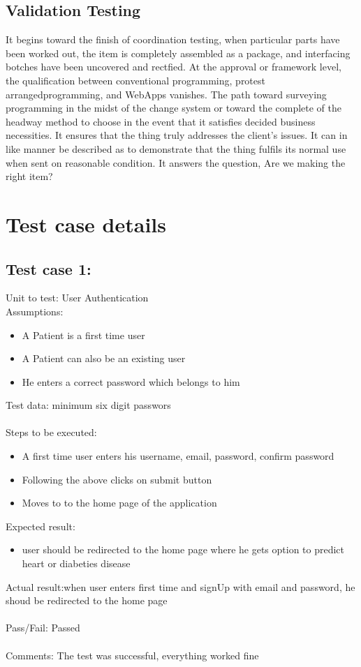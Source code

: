 \documentclass[oneside,12pt]{Classes/VTU}
\begin{document}
	\subsection{Validation Testing}
	It begins toward the finish of coordination testing, when particular parts have been worked out, the item is completely assembled as a package, and interfacing botches have been uncovered and rectfied. At the approval or framework level, the qualification between conventional programming, protest arrangedprogramming, and WebApps vanishes. The path toward surveying programming in the midst of the change system or toward the complete of the headway method to choose in the event that it satisfies decided business necessities. It ensures that the thing truly addresses the client's issues. It can in like manner be described as to demonstrate that the thing fulfils its normal use when sent on reasonable condition. It answers the question, Are we making the right item?
	
		\section{Test case details}
	\subsection{Test case 1:}
	Unit to test: User Authentication\\
	Assumptions:\\
	\begin{itemize}
		\item A Patient is a first time user
		\item A Patient can also be an existing user
		\item He enters a correct password which belongs to him
	\end{itemize}
	Test data: minimum six digit passwors\\
	\\
	Steps to be executed:
	\begin{itemize}
		\item A first time user enters his username, email, password, confirm password
		\item Following the above clicks on submit button
		\item Moves to to the home page of the application
	\end{itemize}
	Expected result:
	\begin{itemize}
		\item user should be redirected to the home page where he gets option to predict heart or diabeties disease
	\end{itemize}
	Actual result:when user enters first time and signUp with email and password, he shoud be redirected to the home page\\
	\\
	Pass/Fail: Passed\\
	\\
	Comments:  The test was successful, everything worked fine
	
\end{document}
